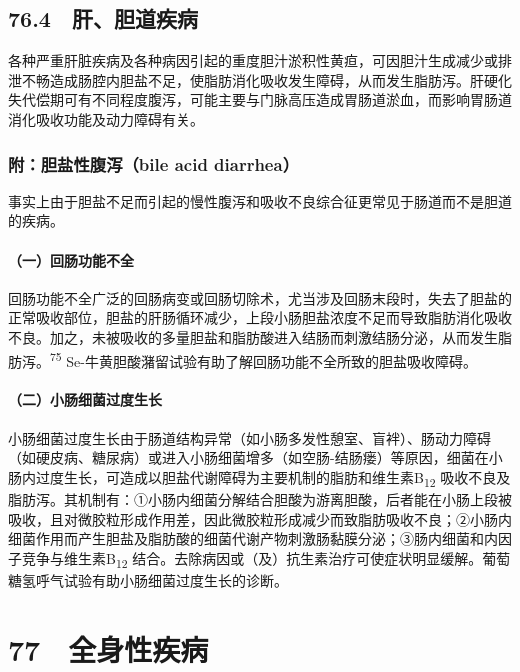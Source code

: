 \subsection{76.4　肝、胆道疾病}

各种严重肝脏疾病及各种病因引起的重度胆汁淤积性黄疸，可因胆汁生成减少或排泄不畅造成肠腔内胆盐不足，使脂肪消化吸收发生障碍，从而发生脂肪泻。肝硬化失代偿期可有不同程度腹泻，可能主要与门脉高压造成胃肠道淤血，而影响胃肠道消化吸收功能及动力障碍有关。

\subsubsection{附：胆盐性腹泻（bile acid diarrhea）}

事实上由于胆盐不足而引起的慢性腹泻和吸收不良综合征更常见于肠道而不是胆道的疾病。

\paragraph{（一）回肠功能不全}

回肠功能不全广泛的回肠病变或回肠切除术，尤当涉及回肠末段时，失去了胆盐的正常吸收部位，胆盐的肝肠循环减少，上段小肠胆盐浓度不足而导致脂肪消化吸收不良。加之，未被吸收的多量胆盐和脂肪酸进入结肠而刺激结肠分泌，从而发生脂肪泻。\textsuperscript{75}
Se-牛黄胆酸潴留试验有助了解回肠功能不全所致的胆盐吸收障碍。

\paragraph{（二）小肠细菌过度生长}

小肠细菌过度生长由于肠道结构异常（如小肠多发性憩室、盲袢）、肠动力障碍（如硬皮病、糖尿病）或进入小肠细菌增多（如空肠-结肠瘘）等原因，细菌在小肠内过度生长，可造成以胆盐代谢障碍为主要机制的脂肪和维生素B\textsubscript{12}
吸收不良及脂肪泻。其机制有：①小肠内细菌分解结合胆酸为游离胆酸，后者能在小肠上段被吸收，且对微胶粒形成作用差，因此微胶粒形成减少而致脂肪吸收不良；②小肠内细菌作用而产生胆盐及脂肪酸的细菌代谢产物刺激肠黏膜分泌；③肠内细菌和内因子竞争与维生素B\textsubscript{12}
结合。去除病因或（及）抗生素治疗可使症状明显缓解。葡萄糖氢呼气试验有助小肠细菌过度生长的诊断。

\protect\hypertarget{text00191.html}{}{}

\section{77　全身性疾病}

